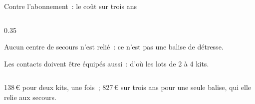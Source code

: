 \begin{frame}{Contre l'abonnement~: le coût sur trois ans}
\begin{columns}[T]
\begin{column}{0.35\textwidth}
\begin{remarque}
\begin{puces}
          \item Aucun centre de secours n'est relié~: ce n'est pas une balise de détresse.
          \item Les contacts doivent être équipés aussi~: d'où les lots de 2 à 4 kits.
        \end{puces}
      \end{remarque}
    \end{column}
  \end{columns}
  \vspace{0.05cm}
  \begin{pointcle}\centering\footnotesize
    138\,€ pour deux kits, une fois~; 827\,€ sur trois ans pour une seule balise, qui elle relie aux secours.
  \end{pointcle}
\end{frame}

